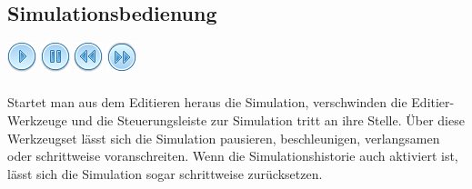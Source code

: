 \documentclass[12pt,a4paper]{scrartcl}
\newcommand{\fckToolBar}{Werkzeugset\xspace}
\begin{document}
\subsection{Simulationsbedienung}
                {\Large \hspace{0.5em} \includegraphics[height=2ex]{images/control_play_blue.png} \hspace{0.5em}   \includegraphics[height=2ex]{images/control_pause_blue.png} \hspace{0.5em}   \includegraphics[height=2ex]{images/control_rewind_blue.png}  \hspace{0.5em} \includegraphics[height=2ex]{images/control_rewind_blue_TURNED.png} } \\ \\
		Startet man aus dem Editieren heraus die Simulation, verschwinden die Editier-Werkzeuge und die Steuerungsleiste zur Simulation tritt an ihre Stelle. Über diese \fckToolBar lässt sich die Simulation pausieren, beschleunigen, verlangsamen oder schrittweise voranschreiten. Wenn die Simulationshistorie auch aktiviert ist, lässt sich die Simulation sogar schrittweise zurücksetzen.

\end{document}

